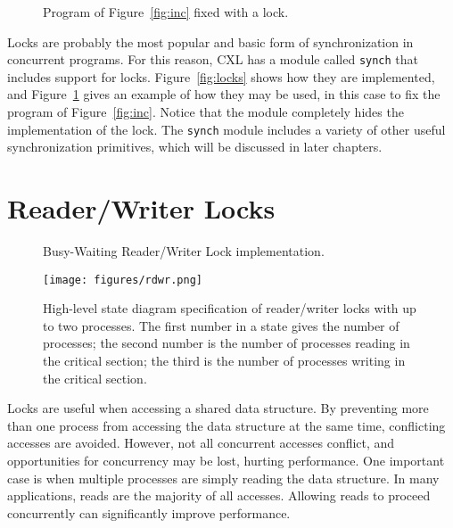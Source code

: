 \documentclass{report}
\newenvironment{code}{
\tcolorbox
}{
\endtcolorbox
}
\begin{document}
\begin{figure}
\begin{code}

\end{code}
\caption{Program of Figure~\ref{fig:inc} fixed with a lock.}
\label{fig:incfixed}
\end{figure}

Locks are probably the most popular and basic form of synchronization
in concurrent programs.  For this reason, CXL has a module called
\texttt{synch} that includes support for locks.
Figure~\ref{fig:locks} shows how they are implemented, and
Figure~\ref{fig:incfixed} gives an example of how they may be used,
in this case to fix the program of Figure~\ref{fig:inc}.
Notice that the module completely hides the implementation of the
lock.
The \texttt{synch} module includes a variety of other useful
synchronization primitives, which will be discussed in later
chapters.

\chapter{Reader/Writer Locks}

\begin{figure}
\begin{code}

\end{code}
\caption{Busy-Waiting Reader/Writer Lock implementation.}
\label{fig:rwbusy}
\end{figure}

\begin{figure}
\begin{center}
\texttt{[image: figures/rdwr.png]}
\end{center}
\caption{High-level state diagram specification of reader/writer locks with
up to two processes.
The first number in a state gives the number of processes; the second number is the
number of processes reading in the critical section; the third is the number of
processes writing in the critical section.}
\label{fig:rdwr}
\end{figure}

Locks are useful when accessing a shared data structure.  By preventing
more than one process from accessing the data structure at the same
time, conflicting accesses are avoided.  However, not all concurrent
accesses conflict, and opportunities for concurrency may be lost,
hurting performance.  One important case is when multiple processes
are simply reading the data structure.
In many applications, reads are the majority of all accesses.
Allowing reads to proceed concurrently can significantly improve performance.
\end{document}
